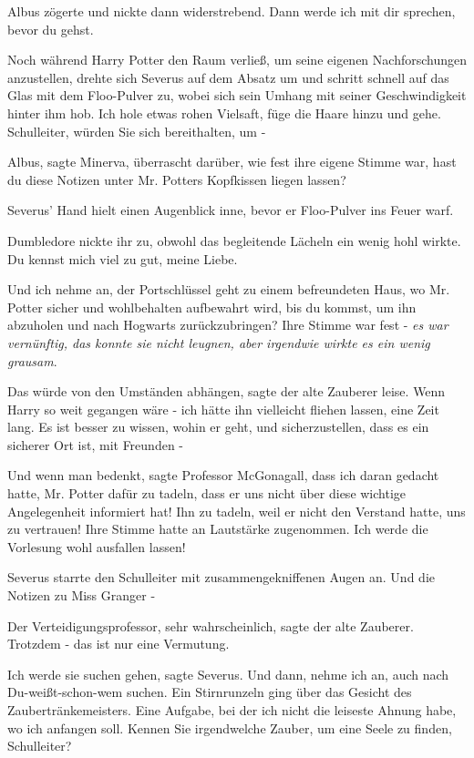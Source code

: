 Albus zögerte und nickte dann widerstrebend. \glqq Dann werde ich mit dir
sprechen, bevor du gehst.\grqq{}

Noch während Harry Potter den Raum verließ, um seine eigenen Nachforschungen
anzustellen, drehte sich Severus auf dem Absatz um und schritt schnell auf das
Glas mit dem Floo-Pulver zu, wobei sich sein Umhang mit seiner Geschwindigkeit
hinter ihm hob. \glqq Ich hole etwas rohen Vielsaft, füge die Haare hinzu und
gehe. Schulleiter, würden Sie sich bereithalten, um -\grqq{}

\glqq Albus\grqq{}, sagte Minerva, überrascht darüber, wie fest ihre eigene
Stimme war, \glqq hast du diese Notizen unter Mr. Potters Kopfkissen liegen
lassen?\grqq{}

Severus' Hand hielt einen Augenblick inne, bevor er Floo-Pulver ins Feuer warf.

Dumbledore nickte ihr zu, obwohl das begleitende Lächeln ein wenig hohl wirkte.
\glqq Du kennst mich viel zu gut, meine Liebe.\grqq{}

\glqq Und ich nehme an, der Portschlüssel geht zu einem befreundeten Haus, wo
Mr. Potter sicher und wohlbehalten aufbewahrt wird, bis du kommst, um ihn
abzuholen und nach Hogwarts zurückzubringen?\grqq{} Ihre Stimme war fest -
\emph{es war vernünftig, das konnte sie nicht leugnen, aber irgendwie wirkte es
ein wenig grausam}.

\glqq Das würde von den Umständen abhängen\grqq{}, sagte der alte Zauberer
leise. \glqq Wenn Harry so weit gegangen wäre - ich hätte ihn vielleicht fliehen
lassen, eine Zeit lang. Es ist besser zu wissen, wohin er geht, und
sicherzustellen, dass es ein sicherer Ort ist, mit Freunden -\grqq{}

\glqq Und wenn man bedenkt\grqq{}, sagte Professor McGonagall, \glqq dass ich
daran gedacht hatte, Mr. Potter dafür zu tadeln, dass er uns nicht über diese
wichtige Angelegenheit informiert hat! Ihn zu tadeln, weil er nicht den Verstand
hatte, uns zu vertrauen!\grqq{} Ihre Stimme hatte an Lautstärke zugenommen.
\glqq Ich werde die Vorlesung wohl ausfallen lassen!\grqq{}

Severus starrte den Schulleiter mit zusammengekniffenen Augen an. \glqq Und die
Notizen zu Miss Granger -\grqq{}

\glqq Der Verteidigungsprofessor, sehr wahrscheinlich\grqq{}, sagte der alte
Zauberer. \glqq Trotzdem - das ist nur eine Vermutung.\grqq{}

\glqq Ich werde sie suchen gehen\grqq{}, sagte Severus. \glqq Und dann, nehme
ich an, auch nach Du-weißt-schon-wem suchen.\grqq{} Ein Stirnrunzeln ging über
das Gesicht des Zaubertränkemeisters. \glqq Eine Aufgabe, bei der ich nicht die
leiseste Ahnung habe, wo ich anfangen soll. Kennen Sie irgendwelche Zauber, um
eine Seele zu finden, Schulleiter?\grqq{}


